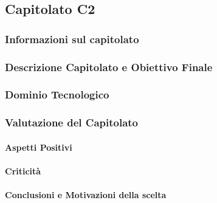 \subsection{Capitolato C2}

\subsubsection{Informazioni sul capitolato}

\subsubsection{Descrizione Capitolato e Obiettivo Finale}

\subsubsection{Dominio Tecnologico}

\subsubsection{Valutazione del Capitolato}

\paragraph{Aspetti Positivi}

\paragraph{Criticità}

\paragraph{Conclusioni e Motivazioni della scelta}